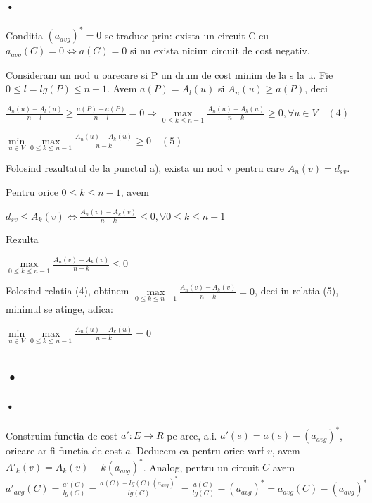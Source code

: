 \documentclass[paper=a4, fontsize=11pt]{scrartcl}
\begin{document}
\paragraph{•}
Conditia $(a_{avg})^*=0$ se traduce prin: exista un circuit C cu $a_{avg}(C)=0\iff a(C)=0$ si nu exista niciun circuit de cost negativ.

Consideram un nod u oarecare si P un drum de cost minim de la s la u. Fie $0 \leqslant l=lg(P) \leqslant n-1$. Avem $a(P)=A_l(u)$ si $A_n(u) \geqslant a(P)$, deci

\begin{center}
$\frac{A_n(u)-A_l(u)}{n-l} \geqslant \frac{a(P)-a(P)}{n-l} = 0 \Rightarrow \max\limits_{0 \leqslant k \leqslant n-1} \frac{A_n(u)-A_k(u)}{n-k} \geqslant 0, \forall u \in V \quad (4)$
\end{center}

\begin{center}
$\min\limits_{u \in V}\max\limits_{0 \leqslant k \leqslant n-1} \frac{A_n(u)-A_k(u)}{n-k} \geqslant 0 \quad (5)$
\end{center}

Folosind rezultatul de la punctul a), exista un nod v pentru care $A_n(v)=d_{sv}$.

Pentru orice $0 \leqslant k \leqslant n-1$, avem

\begin{center}
$d_{sv} \leqslant A_k(v) \iff \frac{A_n(v)-A_k(v)}{n-k} \leqslant 0, \forall 0 \leqslant k \leqslant n-1$
\end{center}

Rezulta

\begin{center}
$\max\limits_{0 \leqslant k \leqslant n-1} \frac{A_n(v)-A_k(v)}{n-k} \leqslant 0$
\end{center}

Folosind relatia (4), obtinem $\max\limits_{0 \leqslant k \leqslant n-1} \frac{A_n(v)-A_k(v)}{n-k}=0$, deci in relatia (5), minimul se atinge, adica:

\begin{center}
$\min\limits_{u \in V}\max\limits_{0 \leqslant k \leqslant n-1} \frac{A_n(u)-A_k(u)}{n-k} =0$
\end{center}

\subsection{•}
\paragraph{•}
Construim functia de cost $a' :E \rightarrow R$ pe arce, a.i. $a'(e) = a(e) - (a_{avg})^*$, oricare ar fi functia de cost $a$. Deducem ca pentru orice varf $v$, avem $A'_k(v) = A_k(v) - k(a_{avg})^*$. Analog, pentru un circuit $C$ avem ${a'}_{avg}(C) = \frac{a'(C)}{lg(C)} = \frac{a(C) - lg(C)(a_{avg})^*}{lg(C)} = \frac{a(C)}{lg(C)} - (a_{avg})^* = a_{avg}(C) - (a_{avg})^*$
\end{document}

